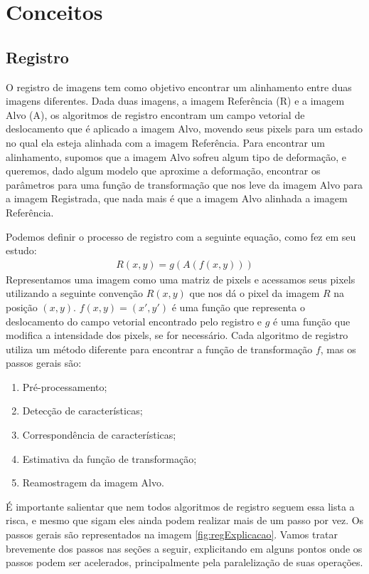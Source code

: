 \chapter{Conceitos}
\label{cap:conceitos}

\section{Registro}
\label{sec:fundamentos}

    O registro de imagens tem como objetivo encontrar um alinhamento entre duas imagens diferentes. Dada duas imagens, 
a imagem Referência (R) e a imagem Alvo (A), os algoritmos de registro encontram um campo
vetorial de deslocamento que é aplicado a imagem Alvo, movendo seus pixels para um estado no qual ela esteja alinhada
com a imagem Referência. Para encontrar um alinhamento, supomos que a imagem Alvo sofreu algum tipo de deformação,
e queremos, dado algum modelo que aproxime a deformação, encontrar os parâmetros para uma função de
transformação que nos leve da imagem Alvo para a imagem Registrada, que nada mais é que a imagem Alvo alinhada a imagem
Referência.

Podemos definir o processo de registro com a seguinte equação, como \cite{brown1992survey} fez em seu estudo:
\begin{align}\label{eq:defregistro}
    R(x,y) = g(A(f(x,y)))
\end{align}
    Representamos uma imagem como uma matriz de pixels e acessamos seus pixels utilizando a seguinte convenção $R(x,y)$ 
que nos dá o pixel da imagem $R$ na posição $(x,y)$. $f(x,y) = (x',y')$ é uma função que representa o deslocamento do 
campo vetorial encontrado pelo registro e $g$ é uma função que modifica a intensidade dos pixels, se for necessário.
Cada algoritmo de registro utiliza um método diferente para encontrar a função de transformação $f$, mas os passos gerais são:
\begin{enumerate}
    \item Pré-processamento;
    \item Detecção de características;
    \item Correspondência de características;
    \item Estimativa da função de transformação;
    \item Reamostragem da imagem Alvo.
\end{enumerate} %
    É importante salientar que nem todos algoritmos de registro seguem essa lista a risca, e mesmo que sigam eles ainda
podem realizar mais de um passo por vez. Os passos gerais são representados na imagem \ref{fig:regExplicacao}. 
Vamos tratar brevemente dos passos nas seções a seguir, explicitando em alguns pontos onde os passos podem ser acelerados,
principalmente pela paralelização de suas operações.

